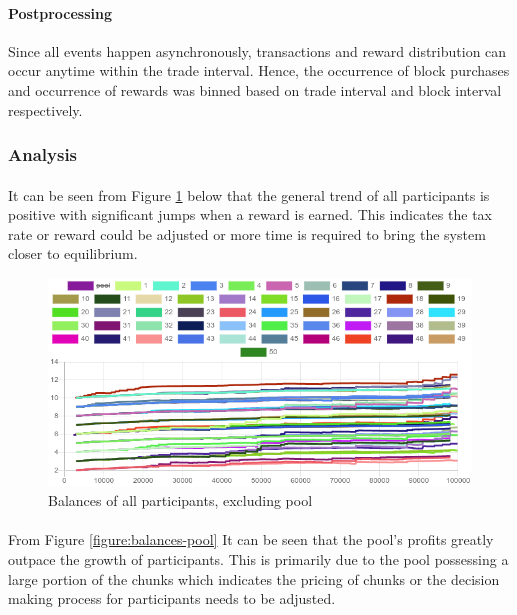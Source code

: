 \paragraph{Postprocessing} Since all events happen asynchronously, transactions and reward distribution can occur anytime within the trade interval. Hence, the occurrence of block purchases and occurrence of rewards was binned based on trade interval and block interval respectively.

\subsubsection{Analysis}

\paragraph{} It can be seen from Figure \ref{figure:balances} below that the general trend of all participants is positive with significant jumps when a reward is earned. This indicates the tax rate or reward could be adjusted or more time is required to bring the system closer to equilibrium.

\begin{figure}[H]
  \centering
  \caption{Balances of all participants, excluding pool}
  \label{figure:balances}
  \includegraphics[width=\linewidth]{media/fig-balances}
\end{figure}

\paragraph{} From Figure \ref{figure:balances-pool} It can be seen that the pool's profits greatly outpace the growth of participants. This is primarily due to the pool possessing a large portion of the chunks which indicates the pricing of chunks or the decision making process for participants needs to be adjusted.

